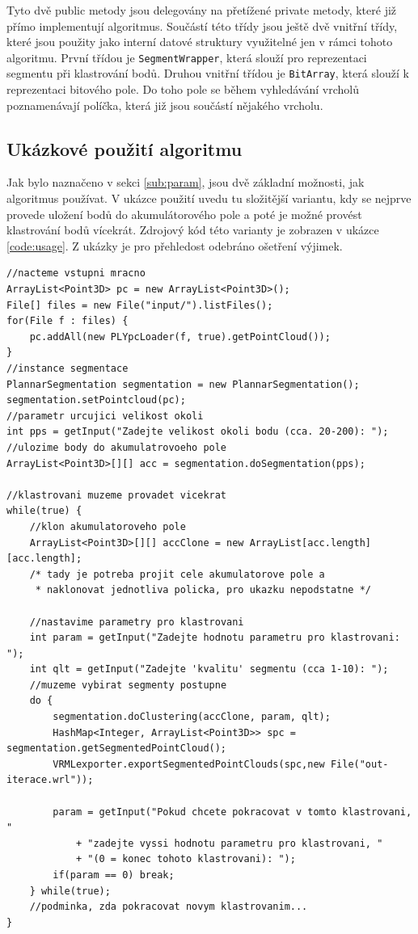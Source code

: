 \documentclass[11pt,twoside,a4paper]{book}
\begin{document}
Tyto dvě public metody jsou delegovány na přetížené private metody, které již přímo implementují algoritmus. Součástí této třídy jsou ještě dvě vnitřní třídy, které jsou použity jako interní datové struktury využitelné jen v rámci tohoto algoritmu. První třídou je \verb|SegmentWrapper|, která slouží pro reprezentaci segmentu při klastrování bodů. Druhou vnitřní třídou je \verb|BitArray|, která slouží k reprezentaci bitového pole. Do toho pole se během vyhledávání vrcholů poznamenávají políčka, která již jsou součástí nějakého vrcholu. 

\subsection{Ukázkové použití algoritmu}
\label{sub:pouziti}

Jak bylo naznačeno v sekci \ref{sub:param}, jsou dvě základní možnosti, jak algoritmus používat. V ukázce použití uvedu tu složitější variantu, kdy se nejprve provede uložení bodů do akumulátorového pole a poté je možné provést klastrování bodů vícekrát. Zdrojový kód této varianty je zobrazen v ukázce \ref{code:usage}. Z ukázky je pro přehledost odebráno ošetření výjimek.

\begin{lstlisting}[label={code:usage},caption={Ukázkové použití implementace algoritmu.}]
//nacteme vstupni mracno
ArrayList<Point3D> pc = new ArrayList<Point3D>();
File[] files = new File("input/").listFiles();
for(File f : files) {
    pc.addAll(new PLYpcLoader(f, true).getPointCloud());
}
//instance segmentace
PlannarSegmentation segmentation = new PlannarSegmentation();
segmentation.setPointcloud(pc);
//parametr urcujici velikost okoli
int pps = getInput("Zadejte velikost okoli bodu (cca. 20-200): ");
//ulozime body do akumulatrovoeho pole
ArrayList<Point3D>[][] acc = segmentation.doSegmentation(pps);

//klastrovani muzeme provadet vicekrat
while(true) {
	//klon akumulatoroveho pole
	ArrayList<Point3D>[][] accClone = new ArrayList[acc.length][acc.length];
	/* tady je potreba projit cele akumulatorove pole a 
	 * naklonovat jednotliva policka, pro ukazku nepodstatne */
	
	//nastavime parametry pro klastrovani
	int param = getInput("Zadejte hodnotu parametru pro klastrovani: ");
	int qlt = getInput("Zadejte 'kvalitu' segmentu (cca 1-10): ");  
	//muzeme vybirat segmenty postupne 
	do {
		segmentation.doClustering(accClone, param, qlt);
		HashMap<Integer, ArrayList<Point3D>> spc = segmentation.getSegmentedPointCloud();
		VRMLexporter.exportSegmentedPointClouds(spc,new File("out-iterace.wrl"));

		param = getInput("Pokud chcete pokracovat v tomto klastrovani, "
			+ "zadejte vyssi hodnotu parametru pro klastrovani, "
			+ "(0 = konec tohoto klastrovani): ");
		if(param == 0) break;
	} while(true);
	//podminka, zda pokracovat novym klastrovanim...
}
\end{lstlisting}
\end{document}
